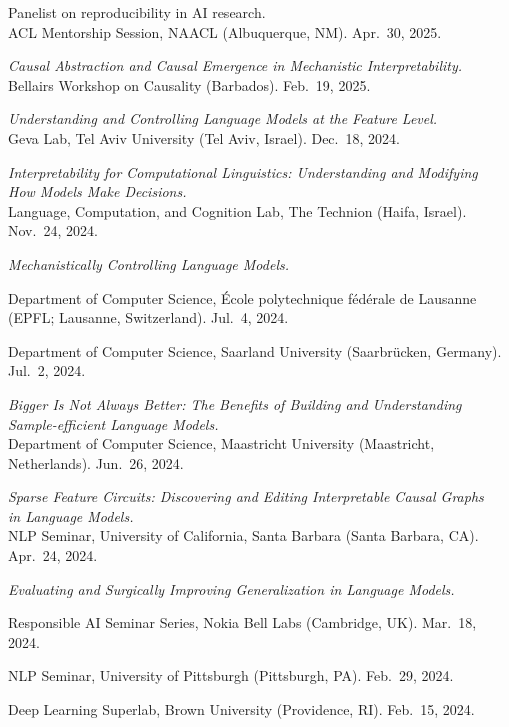 \documentclass[10pt]{article}
\newcommand{\halfblankline}{\quad\vspace{-0.5\baselineskip}\pagebreak[3]}
\begin{document}
	\halfblankline
	
	Panelist on reproducibility in AI research.\\
	ACL Mentorship Session, NAACL (Albuquerque, NM). Apr.\ 30, 2025.
	
	\halfblankline
	
	\emph{Causal Abstraction and Causal Emergence in Mechanistic Interpretability.}\\
	Bellairs Workshop on Causality (Barbados). Feb.\ 19, 2025.

	\halfblankline

	\emph{Understanding and Controlling Language Models at the Feature Level.}\\
	Geva Lab, Tel Aviv University (Tel Aviv, Israel). Dec.\ 18, 2024.

	\halfblankline

	\emph{Interpretability for Computational Linguistics: Understanding and Modifying\\How Models Make Decisions.}\\
	Language, Computation, and Cognition Lab, The Technion (Haifa, Israel). Nov.\ 24, 2024.

	\halfblankline

	\emph{Mechanistically Controlling Language Models.}
	\begin{innerlist}
	\item Department of Computer Science, École polytechnique fédérale de Lausanne (EPFL; Lausanne, Switzerland). Jul.\ 4, 2024.
	\item Department of Computer Science, Saarland University (Saarbrücken, Germany). Jul.\ 2, 2024.
	\end{innerlist}
	
	\halfblankline
	
	\emph{Bigger Is Not Always Better: The Benefits of Building and Understanding\\Sample-efficient Language Models.}\\Department of Computer Science, Maastricht University (Maastricht, Netherlands). Jun.\ 26, 2024.
	
	\halfblankline

	\emph{Sparse Feature Circuits: Discovering and Editing Interpretable Causal Graphs\\in Language Models.}\\NLP Seminar, University of California, Santa Barbara (Santa Barbara, CA). Apr.\ 24, 2024.

	\halfblankline

	\emph{Evaluating and Surgically Improving Generalization in Language Models.}
	\begin{innerlist}
	\item Responsible AI Seminar Series, Nokia Bell Labs (Cambridge, UK). Mar.\ 18, 2024.
	\item NLP Seminar, University of Pittsburgh (Pittsburgh, PA). Feb.\ 29, 2024.
	\item Deep Learning Superlab, Brown University (Providence, RI). Feb.\ 15, 2024.
	\end{innerlist}
\end{document}
